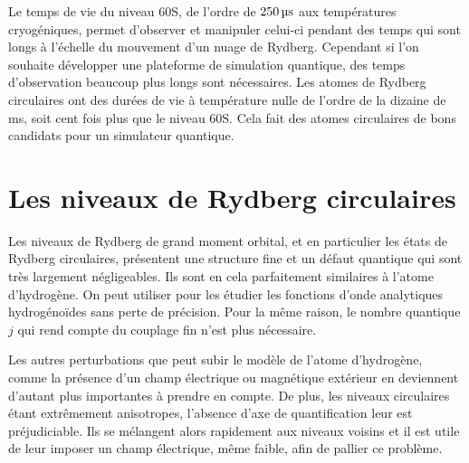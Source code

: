Le temps de vie du niveau 60S, de l'ordre de $\SIvv{250}{\us}$ aux températures cryogéniques, permet d'observer et manipuler celui-ci pendant des temps qui sont longs à l'échelle du mouvement d'un nuage de Rydberg.
Cependant si l'on souhaite développer une plateforme de simulation quantique, des temps d'observation beaucoup plus longs sont nécessaires.
Les atomes de Rydberg circulaires ont des durées de vie à température nulle de l'ordre de la dizaine de \si{\ms}, soit cent fois plus que le niveau 60S.
Cela fait des atomes circulaires de bons candidats pour un simulateur quantique.

\section{Les niveaux de Rydberg circulaires}\label{sec:circ_parabol}
\noindent Les niveaux de Rydberg de grand moment orbital, et en particulier les états de Rydberg circulaires, présentent une structure fine et un défaut quantique qui sont très largement négligeables.
Ils sont en cela parfaitement similaires à l'atome d'hydrogène.
On peut utiliser pour les étudier les fonctions d'onde analytiques hydrogénoïdes sans perte de précision.
Pour la même raison, le nombre quantique $j$ qui rend compte du couplage fin n'est plus nécessaire.

Les autres perturbations que peut subir le modèle de l'atome d'hydrogène, comme la présence d'un champ électrique ou magnétique extérieur en deviennent d'autant plus importantes à prendre en compte.
De plus, les niveaux circulaires étant extrêmement anisotropes, l'absence d'axe de quantification leur est préjudiciable.
Ils se mélangent alors rapidement aux niveaux voisins et il est utile de leur imposer un champ électrique, même faible, afin de pallier ce problème.

